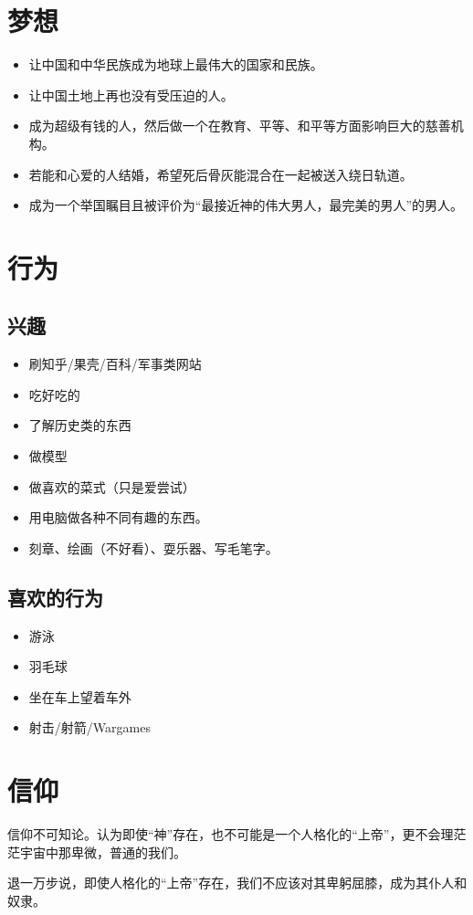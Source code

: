 \documentclass[UTF8]{ctexart}
\begin{document}
\section{梦想}
\begin{itemize}
\item 让中国和中华民族成为地球上最伟大的国家和民族。
\item 让中国土地上再也没有受压迫的人。
\item 成为超级有钱的人，然后做一个在教育、平等、和平等方面影响巨大的慈善机构。
\item 若能和心爱的人结婚，希望死后骨灰能混合在一起被送入绕日轨道。
\item 成为一个举国瞩目且被评价为“最接近神的伟大男人，最完美的男人”的男人。
\end{itemize}
\section{行为}
\subsection{兴趣}
\begin{itemize}
\item 刷知乎/果壳/百科/军事类网站
\item 吃好吃的
\item 了解历史类的东西
\item 做模型
\item 做喜欢的菜式（只是爱尝试）
\item 用电脑做各种不同有趣的东西。
\item 刻章、绘画（不好看）、耍乐器、写毛笔字。
\end{itemize}
\subsection{喜欢的行为}
\begin{itemize}
\item 游泳
\item 羽毛球
\item 坐在车上望着车外
\item 射击/射箭/Wargames
\end{itemize}
\section{信仰}
信仰不可知论。认为即使“神”存在，也不可能是一个人格化的“上帝”，更不会理茫茫宇宙中那卑微，普通的我们。

退一万步说，即使人格化的“上帝”存在，我们不应该对其卑躬屈膝，成为其仆人和奴隶。
\end{document}
